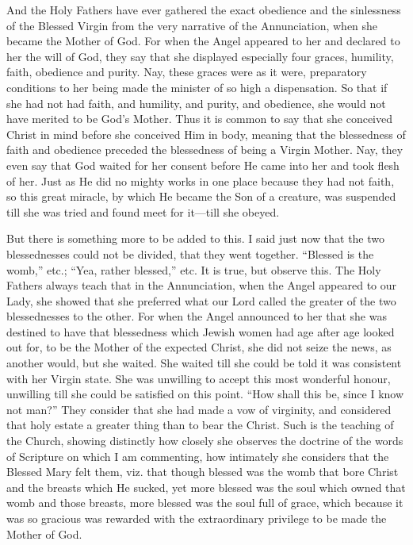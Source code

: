 And the Holy Fathers have ever gathered the exact
obedience and the sinlessness of the Blessed Virgin from the very
narrative of the Annunciation, when she became the Mother of God. For
when the Angel appeared to her and declared to her the will of God,
they say that she displayed especially four graces, humility, faith,
obedience and purity. Nay, these graces were as it were, preparatory
conditions to her being made the minister of so high a dispensation.
So that if she had not had faith, and humility, and purity, and
obedience, she would not have merited to be God's Mother. Thus it is
common to say that she conceived Christ in mind before she conceived
Him in body, meaning that the blessedness of faith and obedience
preceded the blessedness of being a Virgin Mother. Nay, they even say
that God waited for her consent before He came into her and took flesh
of her. Just as He did no mighty works in one place because they had
not faith, so this great miracle, by which He became the Son of a
creature, was suspended till she was tried and found meet for
it—till she obeyed.

But there is something more to be added to this.
I said just now that the two blessednesses could not be divided,
that they went together. ``Blessed is the womb,'' etc.; ``Yea, rather
blessed,'' etc. It is true, but observe this. The Holy Fathers always
teach that in the Annunciation, when the Angel appeared to our Lady,
she showed that she preferred what our Lord called the greater of the
two blessednesses to the other. For when the Angel announced to her
that she was destined to have that blessedness which Jewish women had
age after age looked out for, to be the Mother of the expected Christ,
she did not seize the news, as another would, but she waited. She
waited till she could be told it was consistent with her Virgin state.
She was unwilling to accept this most wonderful honour, unwilling till
she could be satisfied on this point. ``How shall this be, since I know
not man?'' They consider that she had made a vow of virginity, and
considered that holy estate a greater thing than to bear the Christ.
Such is the teaching of the Church, showing distinctly how closely she
observes the doctrine of the words of Scripture on which I am
commenting, how intimately she considers that the Blessed Mary felt
them, viz. that though blessed was the womb that bore Christ and the
breasts which He sucked, yet more blessed was the soul which owned
that womb and those breasts, more blessed was the soul full of grace,
which because it was so gracious was rewarded with the extraordinary
privilege to be made the Mother of God.

